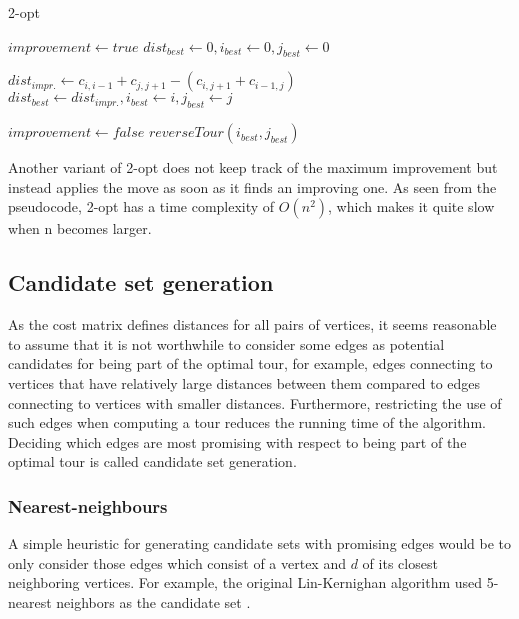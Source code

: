 \documentclass[english, 12pt, a4paper, sci, utf8, a-1b, online]{aaltothesis}
\begin{document}
\begin{algorithm}[H]
	\caption{2-opt} 
	\begin{algorithmic}[1]
	    \State $improvement \leftarrow true$
	        \State $dist_{best} \leftarrow 0, i_{best} \leftarrow 0, j_{best} \leftarrow 0$
	        
    			    \State $dist_{impr.} \leftarrow c_{i, i-1} + c_{j, j+1} - (c_{i, j+1} + c_{i-1, j})$
    			        \State $dist_{best} \leftarrow dist_{impr.}, i_{best} \leftarrow i, j_{best} \leftarrow j$
    			        
    			    \EndIf
    			\EndFor
    		\EndFor
    		    \State $improvement \leftarrow false$
    		\Else
    		    \State $reverseTour(i_{best}, j_{best})$
    		\EndIf
	    \EndWhile
	\end{algorithmic} 
	\label{2optpseudo}
\end{algorithm}



Another variant of 2-opt does not keep track of the maximum improvement but instead applies the move as soon as it finds an improving one. As seen from the pseudocode, 2-opt has a time complexity of $O(n^2)$, which makes it quite slow when n becomes larger.

\subsection{Candidate set generation}
As the cost matrix defines distances for all pairs of vertices, it seems reasonable to assume that it is not worthwhile to consider some edges as potential candidates for being part of the optimal tour, for example, edges connecting to vertices that have relatively large distances between them compared to edges connecting to vertices with smaller distances. Furthermore, restricting the use of such edges when computing a tour reduces the running time of the algorithm. Deciding which edges are most promising with respect to being part of the optimal tour is called candidate set generation.

\subsubsection{Nearest-neighbours}
A simple heuristic for generating candidate sets with promising edges would be to only consider those edges which consist of a vertex and $d$ of its closest neighboring vertices. For example, the original Lin-Kernighan algorithm used 5-nearest neighbors as the candidate set \citep{linkernighan}.
\end{document}
